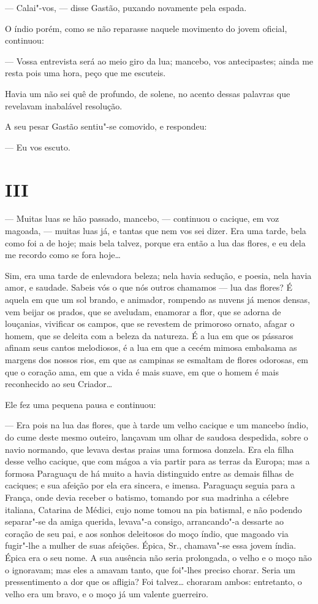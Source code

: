 --- Calai"-vos, --- disse Gastão, puxando novamente pela espada.

O índio porém, como se não reparasse naquele movimento do jovem oficial,
continuou:

--- Vossa entrevista será ao meio giro da lua; mancebo, vos
antecipastes; ainda me resta pois uma hora, peço que me escuteis.

Havia um não sei quê de profundo, de solene, no acento dessas palavras
que revelavam inabalável resolução.

A seu pesar Gastão sentiu"-se comovido, e respondeu:

--- Eu vos escuto.

\section{III}

--- Muitas luas se hão passado, mancebo, --- continuou o cacique, em voz
magoada, --- muitas luas já, e tantas que nem vos sei dizer. Era uma
tarde, bela como foi a de hoje; mais bela talvez, porque era então a lua
das flores, e eu dela me recordo como se fora hoje\ldots{}

Sim, era uma tarde de enlevadora beleza; nela havia sedução, e poesia,
nela havia amor, e saudade. Sabeis vós o que nós outros chamamos --- lua
das flores? É aquela em que um sol brando, e animador, rompendo as
nuvens já menos densas, vem beijar os prados, que se aveludam, enamorar
a flor, que se adorna de louçanias, vivificar os campos, que se revestem
de primoroso ornato, afagar o homem, que se deleita com a beleza da
natureza. É a lua em que os pássaros afinam seus cantos melodiosos, é a
lua em que a cecém mimosa embalsama as margens dos nossos rios, em que
as campinas se esmaltam de flores odorosas, em que o coração ama, em que
a vida é mais suave, em que o homem é mais reconhecido ao seu Criador\ldots{}

Ele fez uma pequena pausa e continuou:

--- Era pois na lua das flores, que à tarde um velho cacique e um
mancebo índio, do cume deste mesmo outeiro, lançavam um olhar de saudosa
despedida, sobre o navio normando, que levava destas praias uma formosa
donzela. Era ela filha desse velho cacique, que com mágoa a via partir
para as terras da Europa; mas a formosa Paraguaçu de há muito a havia
distinguido entre as demais filhas de caciques; e sua afeição por ela
era sincera, e imensa. Paraguaçu seguia para a França, onde devia
receber o batismo, tomando por sua madrinha a célebre italiana, Catarina
de Médici, cujo nome tomou na pia batismal, e não podendo separar"-se da
amiga querida, levava"-a consigo, arrancando"-a dessarte ao coração de seu
pai, e aos sonhos deleitosos do moço índio, que magoado via fugir"-lhe a
mulher de suas afeições. Épica, Sr., chamava"-se essa jovem índia. Épica
era o seu nome. A sua ausência não seria prolongada, o velho e o moço
não o ignoravam; mas eles a amavam tanto, que foi"-lhes preciso chorar.
Seria um pressentimento a dor que os afligia? Foi talvez\ldots{} choraram
ambos: entretanto, o velho era um bravo, e o moço já um valente
guerreiro.

